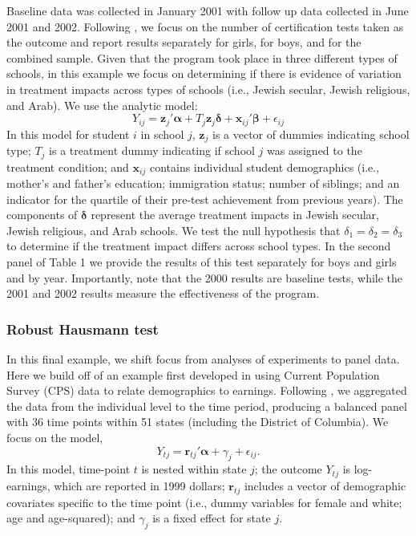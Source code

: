 \documentclass[12pt]{article}
\newcommand{\bm}{\mathbf}
\newcommand{\bs}{\boldsymbol}
\begin{document}
Baseline data was collected in January 2001 with follow up data collected in June 2001 and 2002. Following \citet{Angrist2009effects}, we focus on the number of certification tests taken as the outcome and report results separately for girls, for boys, and for the combined sample. Given that the program took place in three different types of schools, in this example we focus on determining if there is evidence of variation in treatment impacts across types of schools (i.e., Jewish secular, Jewish religious, and Arab). We use the analytic model:
\begin{equation}
Y_{ij} = \bm{z}_j'\bs\alpha + T_j \bm{z}_j \bs\delta + \bm{x}_{ij}'\bs\beta + \epsilon_{ij}
\end{equation}
In this model for student $i$ in school $j$, $\bm{z}_j$ is a vector of dummies indicating school type; $T_j$ is a treatment dummy indicating if school $j$ was assigned to the treatment condition; and $\bm{x}_{ij}$ contains individual student demographics (i.e., mother’s and father’s education; immigration status; number of siblings; and an indicator for the quartile of their pre-test achievement from previous years). The components of $\bs\delta$ represent the average treatment impacts in Jewish secular, Jewish religious, and Arab schools. We test the null hypothesis that $\delta_1 = \delta_2 = \delta_3$ to determine if the treatment impact differs across school types. In the second panel of Table 1 we provide the results of this test separately for boys and girls and by year. Importantly, note that the 2000 results are baseline tests, while the 2001 and 2002 results measure the effectiveness of the program. 

\subsubsection{Robust Hausmann test} 

In this final example, we shift focus from analyses of experiments to panel data. Here we build off of an example first developed in \citet{Bertrand2004how} using Current Population Survey (CPS) data to relate demographics to earnings. Following \citet{Cameron2015practitioners}, we aggregated the data from the individual level to the time period, producing a balanced panel with 36 time points within 51 states (including the District of Columbia). We focus on the model,
\begin{equation}
Y_{tj} = \bm{r}_{tj}'\bs\alpha + \gamma_j + \epsilon_{ij}.
\end{equation}
In this model, time-point $t$ is nested within state $j$; the outcome $Y_{tj}$ is log-earnings, which are reported in 1999 dollars; $\bm{r}_{tj}$ includes a vector of demographic covariates specific to the time point (i.e., dummy variables for female and white; age and age-squared); and $\gamma_j$ is a fixed effect for state $j$. 
\end{document}
